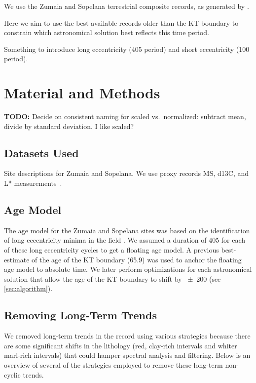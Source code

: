 \documentclass[draft]{agujournal2019}
\begin{document}
We use the Zumaia and Sopelana terrestrial composite records, as generated by .

Here we aim to use the best available records older than the \gls{KT} boundary to constrain which astronomical solution best reflects this time period.

Something to introduce long eccentricity (\qty{405}{\kiloyear} period) and short eccentricity (\qty{100}{\kiloyear} period).

\section{Material and Methods}\label{sec:mm}

\textbf{TODO:} Decide on consistent naming for scaled vs.\ normalized: subtract mean, divide by standard deviation. I like scaled?

\subsection{Datasets Used}\label{sec:data}

Site descriptions for Zumaia and Sopelana.
We use proxy records \gls{MS}, \gls{d13C}, and \gls{L*} measurements~\cite{Batenburg2012,Batenburg2014}.

\subsection{Age Model}\label{sec:agemodel}

The age model for the Zumaia and Sopelana sites was based on the identification of long eccentricity minima in the field .
We assumed a duration of \qty{405}{\kiloyear} for each of these long eccentricity cycles to get a floating age model.
A previous best-estimate of the age of the \gls{KT} boundary (\qty{65.9}{\millionyearago}) was used to anchor the floating age model to absolute time.
We later perform optimizations for each astronomical solution that allow the age of the \gls{KT} boundary to shift by \qty{\pm200}{\kiloyear} (see \cref{sec:algorithm}).

\subsection{Removing Long-Term Trends}\label{sec:detrend}

We removed long-term trends in the record using various strategies because there are some significant shifts in the lithology (red, clay-rich intervals and whiter marl-rich intervals) that could hamper spectral analysis and filtering.
Below is an overview of several of the strategies employed to remove these long-term non-cyclic trends.
\end{document}
